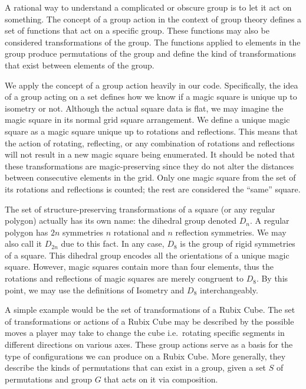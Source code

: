 \documentclass{rhumj_new}
\begin{document}
A rational way to understand a complicated or obscure group is to let it act on something. The
concept of a group action in the context of group theory defines a set of functions that act on a
specific group. These functions may also be considered transformations of the group. The functions
applied to elements in the group produce permutations of the group and define the kind of
transformations that exist between elements of the group.


We apply the concept of a group action heavily in our code. Specifically, the idea of a group
acting on a set defines how we know if a magic square is unique up to isometry or not. Although the
actual square data is flat, we may imagine the magic square in its normal grid square arrangement.
We define a unique magic square as a magic square unique up to rotations and reflections. This
means that the action of rotating, reflecting, or any combination of rotations and reflections will
not result in a new magic square being enumerated. It should be noted that these transformations
are magic-preserving since they do not alter the distances between consecutive elements in the
grid. Only one magic square from the set of its rotations and reflections is counted; the rest are
considered the ``same'' square.

The set of structure-preserving transformations of a square (or any regular polygon) actually
has its own name: the dihedral group denoted $D_n$. A regular polygon has $2n$ symmetries
\textemdash{}
$n$ rotational and $n$ reflection symmetries. We may also call it $D_{2n}$ due to this fact. In any
case, $D_8$ is the group of rigid symmetries of a square. This dihedral group encodes all the
orientations of a unique magic square. However, magic squares contain more than four elements, thus
the rotations and reflections of magic squares are merely congruent to $D_8$. By this point, we may
use the definitions of Isometry and $D_8$ interchangeably.

A simple example would be the set of transformations of a Rubix Cube. The set of transformations or
actions of a Rubix Cube may be described by the possible moves a player may take to change the cube
i.e.\ rotating specific segments in different directions on various axes. These group actions serve
as a basis for the type of configurations we can produce on a Rubix Cube. More generally, they
describe the kinds of permutations that can exist in a group, given a set $S$ of permutations and
group $G$ that acts on it via composition.
\end{document}
